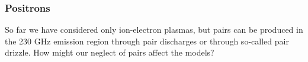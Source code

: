 \subsubsection{Positrons}\label{sec:pair}





So far we have considered only ion-electron plasmas, but pairs can be produced in the 230 GHz emission region through pair discharges or through so-called pair drizzle.  How might our neglect of pairs affect the models?

